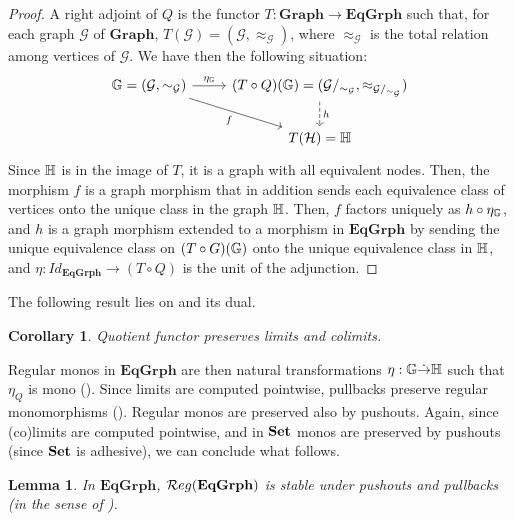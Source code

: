 \documentclass[a4paper, twoside,openright]{report}
\theoremstyle{plain}
\newtheorem{lemma}[theorem]{Lemma}
\newtheorem{cor}[theorem]{Corollary}
\theoremstyle{definition}
\begin{document}
\begin{proof}
    A right adjoint of $Q$ is the functor $T: \mathbf{Graph \rightarrow EqGrph}$ such that, for each graph $\mathcal{G}$ of $\mathbf{Graph}$, $T(\mathcal{G}) = (\mathcal{G}, \approx_{\mathcal{G}})$, where $\approx_{\mathcal{G}}$ is the total relation among vertices of $\mathcal{G}$. We have then the following situation:
    \[
        \begin{tikzcd}
            \eqgraph{G} = (\mathcal{G}, \sim_{\mathcal{G}}) \arrow[r, "{\eta_{\eqgraph{G}}}"] \arrow[dr, "f"swap] & (T \circ Q)(\eqgraph{G}) = (\mathcal{G}/_{\sim_{\mathcal{G}}}, \approx_{\mathcal{G}/_{\sim_{\mathcal{G}}}}) \arrow[d, dashed, "h"] \\
            & T(\mathcal{H}) = \eqgraph{H}
        \end{tikzcd}
    \]
    Since $\mathbb{H}$ is in the image of $T$, it is a graph with all equivalent nodes. Then, the morphism $f$ is a graph morphism that in addition sends each equivalence class of vertices onto the unique class in the graph $\mathbb{H}$. Then, $f$ factors uniquely as $h \circ \eta_{\mathbb{G}}$, and $h$ is a graph morphism extended to a morphism in $\mathbf{EqGrph}$ by sending the unique equivalence class on $(T \circ G)(\mathbb{G})$ onto the unique equivalence class in $\mathbb{H}$, and $\eta: Id_{\mathbf{EqGrph}} \rightarrow (T \circ Q)$ is the unit of the adjunction.
\end{proof}

The following result lies on  and its dual.

\begin{cor}\label{cor:quot_preserves_co_lim}
    Quotient functor preserves limits and colimits. 
\end{cor}

Regular monos in $\mathbf{EqGrph}$ are then natural transformations $\eta: \mathbb{G \dot\rightarrow H}$ such that $\eta_Q$ is mono (). Since limits are computed pointwise, pullbacks preserve regular monomorphisms (). Regular monos are preserved also by pushouts. Again, since (co)limits are computed pointwise, and in $\mathbf{Set}$ monos are preserved by pushouts (since $\mathbf{Set}$ is adhesive), we can conclude what follows.

\begin{lemma}\label{lemma:eqgrph_stab_po_pb}
    In $\mathbf{EqGrph}$,  $\mathcal{R}eg(\mathbf{EqGrph})$ is stable under pushouts and pullbacks (in the sense of ).
\end{lemma}
\end{document}
